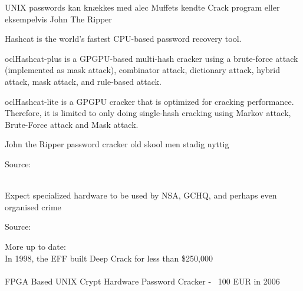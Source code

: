 \documentclass[Screen16to9,17pt]{foils}
\begin{document}
\begin{list1}
\item UNIX passwords kan knækkes med alec Muffets kendte Crack program
  eller eksempelvis John The Ripper 
\end{list1}




\begin{list2}
\item Hashcat is the world's fastest CPU-based password recovery tool.
\item oclHashcat-plus is a GPGPU-based multi-hash cracker using a brute-force attack (implemented as mask attack), combinator attack, dictionary attack, hybrid attack, mask attack, and rule-based attack.
\item oclHashcat-lite is a GPGPU cracker that is optimized for cracking performance. Therefore, it is limited to only doing single-hash cracking using Markov attack, Brute-Force attack and Mask attack.
\item John the Ripper password cracker old skool men stadig nyttig
\end{list2}

Source:\\
\\




Expect specialized hardware to be used by NSA, GCHQ, and perhaps even organised crime





Source: 

More up to date:\\
In 1998, the EFF built Deep Crack for less than \$250,000\\
\\
FPGA Based UNIX Crypt Hardware Password Cracker - ~100 EUR in 2006\\












\slidenext
\end{document}

